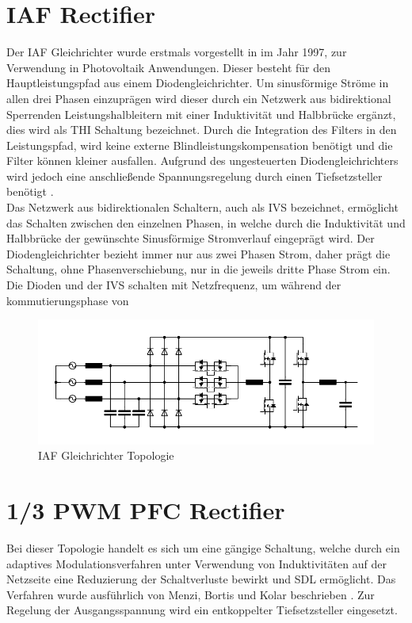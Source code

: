 \section{IAF Rectifier }
Der \gls{IAF} Gleichrichter wurde erstmals vorgestellt in \cite{IAFfirst} im Jahr 1997, zur Verwendung in Photovoltaik Anwendungen. Dieser besteht für den Hauptleistungspfad aus einem Diodengleichrichter. Um sinusförmige Ströme in allen drei Phasen einzuprägen wird dieser durch ein Netzwerk aus bidirektional Sperrenden Leistungshalbleitern mit einer Induktivität und Halbbrücke ergänzt, dies wird als \gls{THI} Schaltung bezeichnet. Durch die Integration des Filters in den Leistungspfad, wird keine externe Blindleistungskompensation benötigt und die Filter können kleiner ausfallen. Aufgrund des ungesteuerten Diodengleichrichters wird jedoch eine anschließende Spannungsregelung durch einen Tiefsetzsteller benötigt \cite{ThesisSchrittwieserBuckTypePFC_2017}.\\
Das Netzwerk aus bidirektionalen Schaltern, auch als \gls{IVS} bezeichnet, ermöglicht das Schalten zwischen den einzelnen Phasen, in welche durch die Induktivität und Halbbrücke der gewünschte Sinusförmige Stromverlauf eingeprägt wird. Der Diodengleichrichter bezieht immer nur aus zwei Phasen Strom, daher prägt die Schaltung, ohne Phasenverschiebung, nur in die jeweils dritte Phase Strom ein. Die Dioden und der \gls{IVS} schalten mit Netzfrequenz, um während der kommutierungsphase von 
\begin{figure}
	\centering
	\includegraphics[width=0.9\linewidth]{content/Grafiken/IAF}
	\caption[\gls{IAF} Gleichrichter Topologie]{\gls{IAF} Gleichrichter Topologie}
	\label{fig:iaf}
\end{figure}


\section{1/3 PWM PFC Rectifier}
\label{sec:GrundlagenB6}
Bei dieser Topologie handelt es sich um eine gängige Schaltung, welche durch ein adaptives Modulationsverfahren unter Verwendung von Induktivitäten auf der Netzseite eine Reduzierung der Schaltverluste bewirkt und \gls{SDL} ermöglicht. Das Verfahren wurde ausführlich von Menzi, Bortis und Kolar beschrieben \cite{13PWMPFC}. Zur Regelung der Ausgangsspannung wird ein entkoppelter Tiefsetzsteller eingesetzt.



